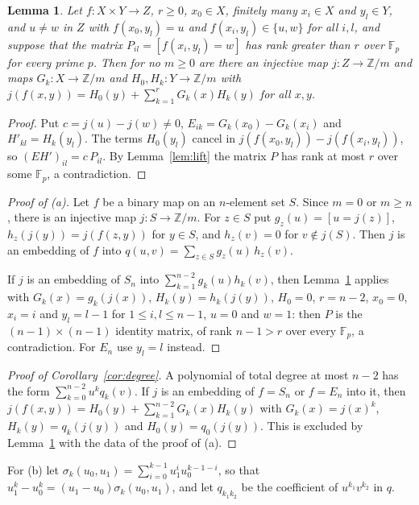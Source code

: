 \documentclass[11pt]{article}
\newtheorem{lemma}{Lemma}
\theoremstyle{definition}
\newcommand{\Z}{\mathbb{Z}}
\newcommand{\F}{\mathbb{F}}
\begin{document}
\begin{lemma}\label{lem:criterion}
Let $f\colon X\times Y\to Z$, $r\ge 0$, $x_0\in X$, finitely many $x_i\in X$ and $y_l\in Y$,
and $u\ne w$ in $Z$ with $f(x_0,y_l)=u$ and $f(x_i,y_l)\in\{u,w\}$ for all $i,l$, and suppose that
the matrix $P_{il}=[f(x_i,y_l)=w]$ has rank greater than $r$ over $\F_p$ for every
prime $p$. Then for no $m\ge 0$ are there an injective map $j\colon Z\to\Z/m$ and maps
$G_k\colon X\to\Z/m$ and $H_0,H_k\colon Y\to\Z/m$ with
$j(f(x,y))=H_0(y)+\sum_{k=1}^{r}G_k(x)H_k(y)$ for all $x,y$.
\end{lemma}

\begin{proof}
Put $c=j(u)-j(w)\ne 0$, $E_{ik}=G_k(x_0)-G_k(x_i)$ and $H'_{kl}=H_k(y_l)$. The terms
$H_0(y_l)$ cancel in $j(f(x_0,y_l))-j(f(x_i,y_l))$, so $(EH')_{il}=c\,P_{il}$. By
Lemma~\ref{lem:lift} the matrix $P$ has rank at most $r$ over some $\F_p$, a contradiction.
\end{proof}

\begin{proof}[Proof of (a)]
Let $f$ be a binary map on an $n$-element set $S$. Since $m=0$ or $m\ge n$, there is an
injective map $j\colon S\to\Z/m$. For $z\in S$ put
$g_z(u)=[u=j(z)]$, $h_z(j(y))=j(f(z,y))$ for $y\in S$, and $h_z(v)=0$ for
$v\notin j(S)$. Then $j$ is an embedding of $f$ into
$q(u,v)=\sum_{z\in S}g_z(u)\,h_z(v)$.

If $j$ is an embedding of $S_n$ into $\sum_{k=1}^{n-2}g_k(u)h_k(v)$, then
Lemma~\ref{lem:criterion} applies with $G_k(x)=g_k(j(x))$, $H_k(y)=h_k(j(y))$, $H_0=0$,
$r=n-2$, $x_0=0$, $x_i=i$ and $y_l=l-1$ for $1\le i,l\le n-1$, $u=0$ and $w=1$: then $P$ is the
$(n-1)\times(n-1)$ identity matrix, of rank $n-1>r$ over every $\F_p$, a contradiction. For $E_n$
use $y_l=l$ instead.
\end{proof}

\begin{proof}[Proof of Corollary~\ref{cor:degree}]
A polynomial of total degree at most $n-2$ has the form $\sum_{k=0}^{n-2}u^kq_k(v)$. If $j$ is an
embedding of $f=S_n$ or $f=E_n$ into it, then $j(f(x,y))=H_0(y)+\sum_{k=1}^{n-2}G_k(x)H_k(y)$ with
$G_k(x)=j(x)^k$, $H_k(y)=q_k(j(y))$ and $H_0(y)=q_0(j(y))$. This is excluded by
Lemma~\ref{lem:criterion} with the data of the proof of (a).
\end{proof}

For (b) let $\sigma_k(u_0,u_1)=\sum_{i=0}^{k-1}u_1^iu_0^{k-1-i}$, so that
$u_1^k-u_0^k=(u_1-u_0)\sigma_k(u_0,u_1)$, and let $q_{k_1k_2}$ be the coefficient of
$u^{k_1}v^{k_2}$ in $q$.
\end{document}
